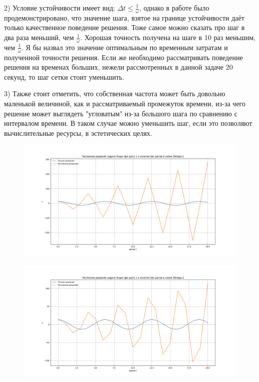 \documentclass[diploma]{nanolab2015}
\begin{document}
2) Условие устойчивости имеет вид: $\Delta t \leq \frac{1}{\omega}$, однако в работе было продемонстрировано, что значение шага, взятое на границе устойчивости даёт только качественное поведение решения. Тоже самое можно сказать про шаг в два раза меньший, чем $\frac{1}{\omega}$. Хорошая точность получена на шаге в 10 раз меньшим, чем $\frac{1}{\omega}$. Я бы назвал это значение оптимальным по временным затратам и полученной точности решения. Если же необходимо рассматривать поведение решения на временах больших, нежели рассмотренных в данной задаче 20 секунд, то шаг сетки стоит уменьшить.

3) Также стоит отметить, что собственная частота может быть довольно маленькой величиной, как и рассматриваемый промежуток времени, из-за чего решение может выглядеть "угловатым" из-за большого шага по сравнению с интервалом времени. В таком случае можно уменьшить шаг, если это позволяют вычислительные ресурсы, в эстетических целях.

\begin{figure}[h!]
\centering
\includegraphics[scale=0.5]{1 1.png}
\end{figure}

\begin{figure}[h!]
\centering
\includegraphics[scale=0.5]{1 2.png}
\end{figure}
\end{document}
